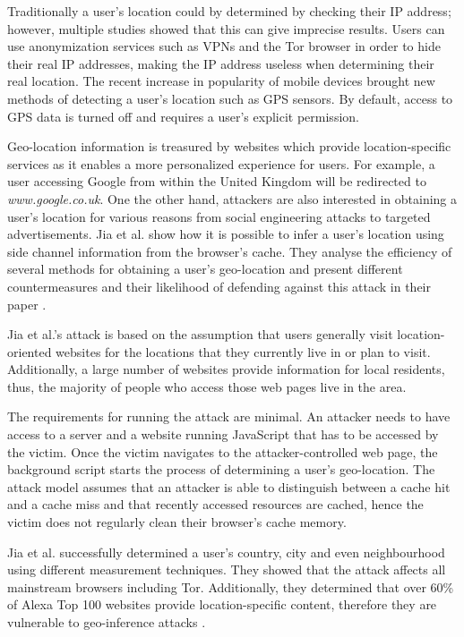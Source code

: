 \documentclass[10pt,a4paper,twoside]{book}
\begin{document}
Traditionally a user's location could by determined by checking their IP address; however, multiple studies showed that this can give imprecise results. Users can use anonymization services such as VPNs and the Tor \cite{tor} browser in order to hide their real IP addresses, making the IP address useless when determining their real location. The recent increase in popularity of mobile devices brought new methods of detecting a user's location such as GPS sensors. By default, access to GPS data is turned off and requires a user's explicit permission. 

Geo-location information is treasured by websites which provide location-specific services as it enables a more personalized experience for users. For example, a user accessing Google from within the United Kingdom will be redirected to \textit{www.google.co.uk}. One the other hand, attackers are also interested in obtaining a user's location for various reasons from social engineering attacks to targeted advertisements. Jia et al. \cite{jia2015know} show how it is possible to infer a user's location using side channel information from the browser's cache. They analyse the efficiency of several methods for obtaining a user's geo-location and present different countermeasures and their likelihood of defending against this attack in their paper \cite{jia2015know}.

Jia et al.'s \cite{jia2015know} attack is based on the assumption that users generally visit location-oriented websites for the locations that they currently live in or plan to visit. Additionally, a large number of websites provide information for local residents, thus, the majority of people who access those web pages live in the area. 

The requirements for running the attack are minimal. An attacker needs to have access to a server and a website running JavaScript that has to be accessed by the victim. Once the victim navigates to the attacker-controlled web page, the background script starts the process of determining a user's geo-location. The attack model assumes that an attacker is able to distinguish between a cache hit and a cache miss and that recently accessed resources are cached, hence the victim does not regularly clean their browser's cache memory.

Jia et al. \cite{jia2015know} successfully determined a user's country, city and even neighbourhood using different measurement techniques. They showed that the attack affects all mainstream browsers including Tor. Additionally, they determined that over 60\% of Alexa Top 100 \cite{alexa500} websites provide location-specific content, therefore they are vulnerable to geo-inference attacks \cite{jia2015know}.
\end{document}
